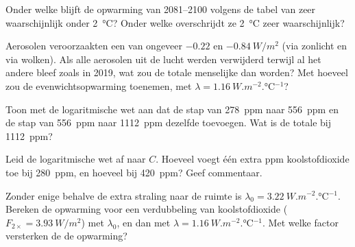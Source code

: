 \begin{exercise}[$\star\star$]\label{exo:g12:climate-change:11}
Onder welke  blijft de opwarming van 2081--2100 volgens de tabel van 
zeer waarschijnlijk onder \qty{2}{\degreeCelsius}? Onder welke
overschrijdt ze \qty{2}{\degreeCelsius} zeer waarschijnlijk?
\end{exercise}

\begin{exercise}[$\star\star\star$]\label{exo:g12:climate-change:12}
Aerosolen veroorzaakten een  van ongeveer $-0.22$ en $\qty{-0.84}{W/m^2}$
(via zonlicht en via wolken). Als alle aerosolen uit de
lucht werden verwijderd terwijl al het andere bleef zoals in 2019, wat zou de totale menselijke
 dan worden? Met hoeveel zou de evenwichtsopwarming toenemen, met
$\lambda = \qty{1.16}{W.m^{-2}.\degreeCelsius^{-1}}$?
\end{exercise}

\begin{exercise}[$\star\star\star$]\label{exo:g12:climate-change:13}
Toon met de logaritmische wet aan dat de stap van \qty{278}{ppm} naar
\qty{556}{ppm} en de stap van \qty{556}{ppm} naar \qty{1112}{ppm} dezelfde
 toevoegen. Wat is de totale  bij \qty{1112}{ppm}?
\end{exercise}

\begin{exercise}[$\star\star\star$]\label{exo:g12:climate-change:14}
Leid de logaritmische wet af naar $C$. Hoeveel  voegt
één extra ppm koolstofdioxide toe bij \qty{280}{ppm}, en hoeveel bij
\qty{420}{ppm}? Geef commentaar.
\end{exercise}

\begin{exercise}[$\star\star\star$]\label{exo:g12:climate-change:15}
Zonder enige  behalve de extra straling naar de ruimte is
$\lambda_0 = \qty{3.22}{W.m^{-2}.\degreeCelsius^{-1}}$. Bereken de opwarming
voor een verdubbeling van koolstofdioxide ($F_{2\times} = \qty{3.93}{W/m^2}$) met
$\lambda_0$, en dan met $\lambda = \qty{1.16}{W.m^{-2}.\degreeCelsius^{-1}}$. Met
welke factor versterken de  de opwarming?
\end{exercise}

